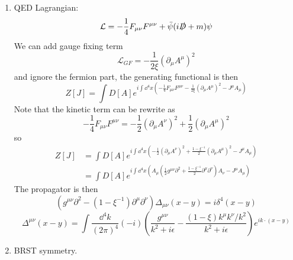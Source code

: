 \documentclass{article}
\newcommand{\lag}{\mathcal{L}}
\begin{document}
\begin{enumerate}[{\bf 1.}]
	\item QED Lagrangian:
	$$\lag=-\frac{1}{4}F_{\mu\nu}F^{\mu\nu}+\bar\psi(i\slashed D+m)\psi$$
	We can add gauge fixing term
	$$\lag_{GF}=-\frac{1}{2\xi}(\partial_{\mu}A^{\mu})^2$$
	and ignore the fermion part, the generating functional is then
	$$Z[J]=\int D[A]e^{i\int\dd^4x(-\frac{1}{4}F_{\mu\nu}F^{\mu\nu}-\frac{1}{2\xi}(\partial_{\mu}A^{\mu})^2-J^{\mu}A_{\mu})}$$
	Note that the kinetic term can be rewrite as
	$$-\frac{1}{4}F_{\mu\nu}F^{\mu\nu}=-\frac{1}{2}(\partial_{\mu}A^{\nu})^2+\frac{1}{2}(\partial_{\mu}A^{\mu})^2$$
	so
	\begin{align*}
		Z[J]&=\int D[A]e^{i\int\dd^4x(-\frac{1}{2}(\partial_{\mu}A^{\nu})^2+\frac{1-\xi^{-1}}{2}(\partial_{\mu}A^{\mu})^2-J^{\mu}A_{\mu})}\\
		&=\int D[A]e^{i\int\dd^4x(A_{\mu}(\frac{1}{2}g^{\mu\nu}\partial^2+\frac{1-\xi^{-1}}{2}\partial^{\mu}\partial^{\nu})A_{\nu}-J^{\mu}A_{\mu})}
	\end{align*}
	The propagator is then
	$$(g^{\mu\nu}\partial^2-(1-\xi^{-1})\partial^{\mu}\partial^{\nu})\Delta_{\mu\nu}(x-y)=i\delta^4(x-y)$$
		$$\Delta^{\mu\nu}(x-y)=\int\frac{\dd^4k}{(2\pi)^4}(-i)(\frac{g^{\mu\nu}}{k^2+i\epsilon}-\frac{(1-\xi)k^{\mu}k^{\nu}/k^2}{k^2+i\epsilon})e^{ik\cdot(x-y)}$$
	\item BRST symmetry.


\end{enumerate}
\end{document}
